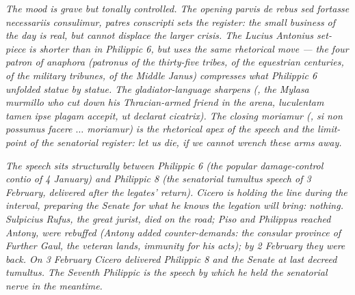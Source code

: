 \textit{The mood is grave but tonally controlled. The
opening \textit{parvis de rebus sed fortasse necessariis
consulimur, patres conscripti} sets the register: the small
business of the day is real, but cannot displace the larger
crisis. The Lucius Antonius set-piece is shorter than in
Philippic 6, but uses the same rhetorical move --- the four
\textit{patron of} anaphora (\textit{patronus} of the
thirty-five tribes, of the equestrian centuries, of the
military tribunes, of the Middle Janus) compresses what
Philippic 6 unfolded statue by statue. The gladiator-language
sharpens (, the Mylasa murmillo who cut down
his Thracian-armed friend in the arena, \textit{luculentam
tamen ipse plagam accepit, ut declarat cicatrix}). The
closing \textit{moriamur} (, \textit{si non
possumus facere $\ldots$ moriamur}) is the rhetorical apex of
the speech and the limit-point of the senatorial register:
let us die, if we cannot wrench these arms away.}

\textit{The speech sits structurally between Philippic 6
(the popular damage-control \textit{contio} of 4 January) and
Philippic 8 (the senatorial \textit{tumultus} speech of
3 February, delivered after the legates' return). Cicero is
holding the line during the interval, preparing the Senate
for what he knows the legation will bring: nothing. Sulpicius
Rufus, the great jurist, died on the road; Piso and Philippus
reached Antony, were rebuffed (Antony added counter-demands:
the consular province of Further Gaul, the veteran lands,
immunity for his acts); by 2 February they were back. On
3 February Cicero delivered Philippic 8 and the Senate at
last decreed \textit{tumultus}. The Seventh Philippic is the
speech by which he held the senatorial nerve in the meantime.}
